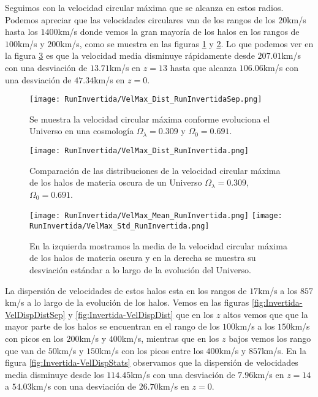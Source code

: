 Seguimos con la velocidad circular máxima que se alcanza en estos radios. Podemos apreciar que las velocidades circulares van de los rangos de los $20$km/s hasta los $1400$km/s donde vemos la gran mayoría de los halos en los rangos de $100$km/s y $200$km/s, como se muestra en las figuras \ref{fig:Invertida-VelMaxDistSep} y \ref{fig:Invertida-VelMaxDist}. Lo que podemos ver en la figura \ref{fig:Invertida-VelMaxStats} es que la velocidad  media disminuye rápidamente desde $207.01$km/s con una desviación de $13.71$km/s en $z=13$ hasta que alcanza $106.06$km/s con una desviación de $47.34$km/s en $z=0$. 

\begin{figure}[H]
    \centering
    \texttt{[image: RunInvertida/VelMax\_Dist\_RunInvertidaSep.png]}
    \caption[Velocidad circular máxima en la evolución de un Universo $\Omega_\lambda = 0.309 $, $\Omega_0 = 0.691$]{\footnotesize Se muestra la velocidad circular máxima conforme evoluciona el Universo en una cosmología $\Omega_\lambda = 0.309 $ y $\Omega_0 = 0.691$.}
    \label{fig:Invertida-VelMaxDistSep}
\end{figure}

\begin{figure}[H]
    \centering
    \texttt{[image: RunInvertida/VelMax\_Dist\_RunInvertida.png]}
    \caption[Distribución de la velocidad circular máxima de un Universo $\Omega_\lambda = 0.309 $, $\Omega_0 = 0.691$]{\footnotesize Comparación de las distribuciones de la velocidad circular máxima de los halos de materia oscura de un Universo $\Omega_\lambda = 0.309 $, $\Omega_0 = 0.691$.}
    \label{fig:Invertida-VelMaxDist}
\end{figure}

\begin{figure}[H]
    \centering
    \texttt{[image: RunInvertida/VelMax\_Mean\_RunInvertida.png]}
    \texttt{[image: RunInvertida/VelMax\_Std\_RunInvertida.png]}
    \caption[Media y desviación estándar de la velocidad circular máxima de un Universo $\Omega_\lambda = 0.309 $, $\Omega_0 = 0.691$]{\footnotesize En la izquierda mostramos la media de la velocidad circular máxima de los halos de materia oscura y en la derecha se muestra su desviación estándar a lo largo de la evolución del Universo.}
    \label{fig:Invertida-VelMaxStats}
\end{figure}


La dispersión de velocidades de estos halos esta en los rangos de $17$km/s a los $857$km/s a lo largo de la evolución de los halos. Vemos en las figuras \ref{fig:Invertida-VelDispDistSep} y \ref{fig:Invertida-VelDispDist} que en los $z$ altos vemos que que la mayor parte de los halos se encuentran en el rango de los $100$km/s a los $150$km/s con picos en los $200$km/s y $400$km/s, mientras que en los $z$ bajos vemos los rango que van de $50$km/s y $150$km/s con los picos entre los $400$km/s y $857$km/s. En la figura \ref{fig:Invertida-VelDispStats} observamos que la dispersión de velocidades media disminuye desde los $114.45$km/s con una desviación de $7.96$km/s en $z=14$ a $54.03$km/s con una desviación de $26.70$km/s en $z=0$.


